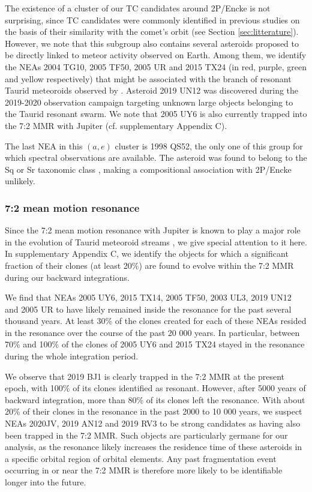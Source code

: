 \documentclass[letters,a4paper,fleqn,usenatbib]{mnras}
\begin{document}
The existence of a cluster of our TC candidates around 2P/Encke is not surprising, since TC candidates were commonly identified in previous studies on the basis of their similarity with the comet's orbit (see Section \ref{sec:litterature}). However, we note that this subgroup also contains several asteroids proposed to be directly linked to meteor activity observed on Earth. Among them, we identify the NEAs 2004 TG10, 2005 TF50, 2005 UR and 2015 TX24 (in red, purple, green and yellow respectively) that might be associated with the branch of resonant Taurid meteoroids observed by \cite{Spurny2017}. Asteroid 2019 UN12 was discovered during the 2019-2020 observation campaign targeting unknown large objects belonging to the Taurid resonant swarm. We note that 2005 UY6 is also currently trapped into the 7:2 MMR with Jupiter (cf. supplementary Appendix C). 

The last NEA in this $(a,e)$ cluster is 1998 QS52, the only one of this group for which spectral observations are available. The asteroid was found to belong to the Sq or Sr taxonomic class \citep{Binzel2004,Popescu2014,Tubiana2015}, making a compositional association with 2P/Encke unlikely.

\subsubsection{7:2 mean motion resonance}

Since the 7:2 mean motion resonance with Jupiter is known to play a major role in the evolution of Taurid meteoroid streams \citep{Asher1991,Asher1993b,Asher1998,McBeath1999,Dubietis2007,Spurny2017}, we give special attention to it here. In supplementary Appendix C, we identify the objects for which a significant fraction of their clones (at least 20\%) are found to evolve within the 7:2 MMR during our backward integrations. 

We find that NEAs 2005 UY6, 2015 TX14, 2005 TF50, 2003 UL3, 2019 UN12 and 2005 UR to have likely remained inside the resonance for the past several thousand years. At least 30\% of the clones created for each of these NEAs resided in the resonance over the course of the past 20 000 years. In particular, between 70\% and 100\% of the clones of 2005 UY6 and 2015 TX24 stayed in the resonance during the whole integration period.

We observe that 2019 BJ1 is clearly trapped in the 7:2 MMR at the present epoch, with 100\% of its clones identified as resonant. However, after 5000 years of backward integration, more than 80\% of its clones left the resonance. With about 20\% of their clones in the resonance in the past 2000 to 10 000 years, we suspect NEAs 2020JV, 2019 AN12 and 2019 RV3 to be strong candidates as having also been trapped in the 7:2 MMR. Such objects are particularly germane for our analysis, as the resonance likely increases the residence time of these asteroids in a specific orbital region of orbital elements. Any past fragmentation event occurring in or near the 7:2 MMR is therefore more likely to be identifiable longer into the future.
\end{document}
